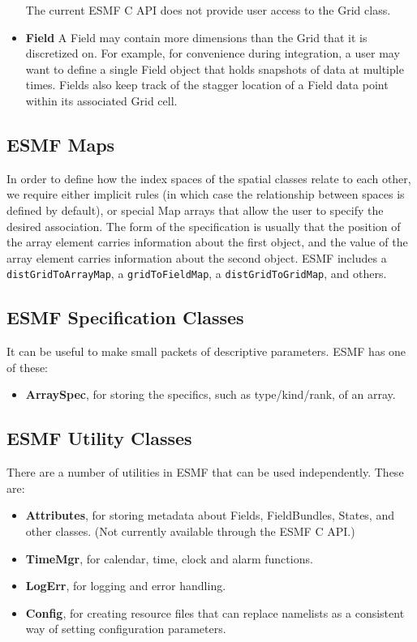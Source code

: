 \begin{itemize}
The current ESMF C API does not provide user access to the Grid class.

\item {\bf Field}  A Field may contain more dimensions than the 
Grid that it is discretized on.  For example, for convenience 
during integration, a user may want to define a single Field object 
that holds snapshots of data at multiple times.  Fields also 
keep track of the stagger location of a Field data point within its 
associated Grid cell.

\end{itemize}

\subsection{ESMF Maps}

In order to define how the index spaces of the spatial classes relate
to each other, we require either implicit rules (in which case the
relationship between spaces is defined by default), or special Map arrays
that allow the user to specify the desired association.  The form of the 
specification is usually that the position of the array element carries
information about the first object, and the value of the array element carries
information about the second object.  ESMF includes a {\tt distGridToArrayMap},
a {\tt gridToFieldMap}, a {\tt distGridToGridMap}, and others.

\subsection{ESMF Specification Classes}

It can be useful to make small packets
of descriptive parameters.  ESMF has one of these:
\begin{itemize}
\item {\bf ArraySpec}, for storing the specifics, such as type/kind/rank,
of an array.
\end{itemize}

\subsection{ESMF Utility Classes}

There are a number of utilities in ESMF that can be used independently.
These are:
\begin{itemize}
\item {\bf Attributes}, for storing metadata about Fields,
FieldBundles, States, and other classes.
(Not currently available through the ESMF C API.)
\item {\bf TimeMgr}, for calendar, time, clock and alarm functions.
\item {\bf LogErr}, for logging and error handling.
\item {\bf Config}, for creating resource files that can replace namelists
as a consistent way of setting configuration parameters.
\end{itemize}

